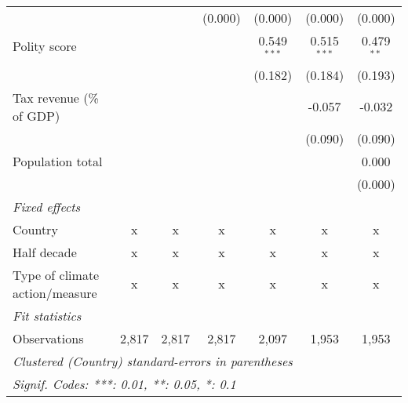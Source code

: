 \begin{tabular}{lcccccc}
                                                                             &               &              & (0.000)        & (0.000)        & (0.000)        & (0.000)\\   
   Polity score                                                              &               &              &                & 0.549$^{***}$  & 0.515$^{***}$  & 0.479$^{**}$\\   
                                                                             &               &              &                & (0.182)        & (0.184)        & (0.193)\\   
   Tax revenue (\% of GDP)                                                   &               &              &                &                & -0.057         & -0.032\\   
                                                                             &               &              &                &                & (0.090)        & (0.090)\\   
   Population total                                                          &               &              &                &                &                & 0.000\\   
                                                                             &               &              &                &                &                & (0.000)\\   
   \emph{Fixed effects}\\
   Country                                                                   & x             & x            & x              & x              & x              & x\\  
   Half decade                                                               & x             & x            & x              & x              & x              & x\\  
   Type of climate action/measure                                            & x             & x            & x              & x              & x              & x\\  
   \midrule \emph{Fit statistics}\\
   Observations                                                              & 2,817         & 2,817        & 2,817          & 2,097          & 1,953          & 1,953\\  
   \midrule
   \multicolumn{7}{l}{\emph{Clustered (Country) standard-errors in parentheses}}\\
   \multicolumn{7}{l}{\emph{Signif. Codes: ***: 0.01, **: 0.05, *: 0.1}}\\
\end{tabular}
\par\endgroup


